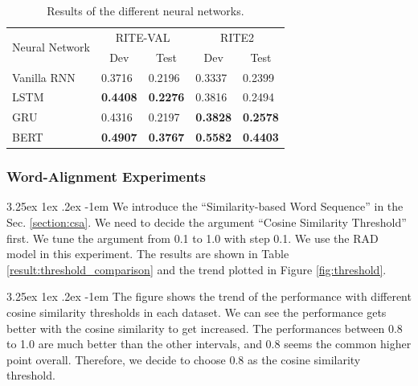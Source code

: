 \documentclass[12pt]{article}
\makeatletter
\renewcommand\paragraph{\@startsection{paragraph}{5}{\z@}%
  {3.25ex \@plus1ex \@minus.2ex}%
  {-1em}%
  {\normalfont\normalsize\bfseries}}
\makeatother
\begin{document}
\begin{CJK*}{UTF8}{bkai}
\begin{spacing}{1.77}
\begin{table}[H]
  \centering
  \setlength{\extrarowheight}{-3pt}
  \begin{tabular}{|l|l|l|l|l|}
  \hline
  \multirow{2}{*}{Neural Network} & \multicolumn{2}{c|}{RITE-VAL} & \multicolumn{2}{c|}{RITE2} \\ \cline{2-5}
   & \multicolumn{1}{c|}{Dev} & \multicolumn{1}{c|}{Test} & \multicolumn{1}{c|}{Dev} & \multicolumn{1}{c|}{Test} \\ \hline
  Vanilla RNN & 0.3716 & 0.2196 & 0.3337 & 0.2399 \\ \hline
  LSTM & \textbf{0.4408} & \textbf{0.2276} & 0.3816 & 0.2494 \\ \hline
  GRU & 0.4316 & 0.2197 & \textbf{0.3828} & \textbf{0.2578} \\ \hline
  BERT & \textbf{0.4907} & \textbf{0.3767} & \textbf{0.5582} & \textbf{0.4403} \\ \hline
  \end{tabular}
  \caption{Results of the different neural networks.}
  \label{result:rnn_types}
\end{table}

\subsubsection{Word-Alignment Experiments}
\paragraph{}
We introduce the ``Similarity-based Word Sequence'' in the Sec. \ref{section:csa}. We need to decide the argument ``Cosine Similarity Threshold'' first. We tune the argument from 0.1 to 1.0 with step 0.1. We use the RAD model in this experiment. The results are shown in Table \ref{result:threshold_comparison} and the trend plotted in Figure \ref{fig:threshold}.

\paragraph{}
The figure shows the trend of the performance with different cosine similarity thresholds in each dataset. We can see the performance gets better with the cosine similarity to get increased. The performances between 0.8 to 1.0 are much better than the other intervals, and 0.8 seems the common higher point overall. Therefore, we decide to choose 0.8 as the cosine similarity threshold.


\end{spacing}
\end{CJK*}
\end{document}
